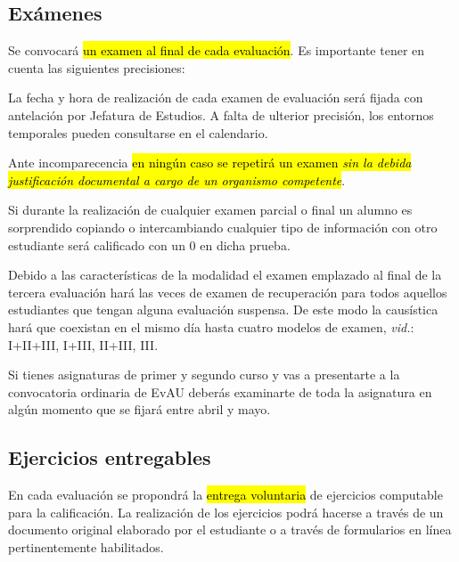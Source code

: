 \documentclass[a5paper,12pt]{extarticle}
\begin{document}
	\subsection{Exámenes}
	
	Se convocará \hl{un examen al final de cada evaluaci\'on}. Es importante tener en cuenta las siguientes precisiones: 
	
\begin{itemize}
{\footnotesize
	\item La fecha y hora de realización de cada examen de evaluación será fijada con antelación por
Jefatura de Estudios. A falta de ulterior precisión, los entornos temporales pueden consultarse en el calendario.
	\item Ante incomparecencia \hl{en ning\'un caso se repetir\'a un examen \textit{sin la debida justificaci\'on documental a cargo de un organismo competente}}.
	\item Si durante la realización de cualquier examen parcial o final un alumno es sorprendido copiando o intercambiando cualquier tipo de información con otro estudiante será calificado con un $0$ en dicha prueba.
	\item Debido a las características de la modalidad el examen emplazado al final de la tercera evaluación hará las veces de examen de recuperación para todos aquellos estudiantes que tengan alguna evaluación suspensa. De este modo la causística hará que coexistan en el mismo día hasta cuatro modelos de examen, \textit{vid.}: {\scriptsize I+II+III, I+III, II+III, III}.
	\item Si tienes asignaturas de primer y segundo curso  y vas a presentarte a la convocatoria ordinaria de {\scriptsize EvAU} deberás examinarte de toda la asignatura en algún momento que se fijará entre abril y mayo.
	}
\end{itemize}


	\subsection{Ejercicios entregables}
	
	En cada evaluaci\'on se propondr\'a la \hl{entrega voluntaria} de ejercicios computable para la calificaci\'on. La realización de los ejercicios podrá hacerse a través de un documento original elaborado por el estudiante o a través de formularios en línea pertinentemente habilitados.
\end{document}
